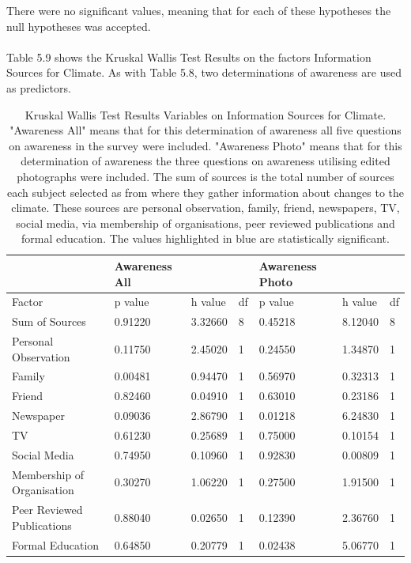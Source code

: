 There were no significant values, meaning that for each of these hypotheses the null hypotheses was accepted.
\paragraph{}
Table 5.9 shows the Kruskal Wallis Test Results on the factors Information Sources for Climate. As with Table 5.8, two determinations of awareness are used as predictors.



\begin{table}[H]
    \centering
    \begin{tabular}{|l|l|l|l|l|l|l|}
    \hline
        & \textbf{Awareness All} & ~ & ~ & \textbf{Awareness Photo} & ~ & ~ \\ \hline
        Factor & p value & h value & df & p value & h value & df \\ \hline
        Sum of Sources & 0.91220 & 3.32660 & 8 & 0.45218 & 8.12040 & 8 \\ \hline
        Personal Observation & 0.11750 & 2.45020 & 1 & 0.24550 & 1.34870 & 1 \\ \hline
        Family & \cellcolor[HTML]{7df9ff} 0.00481 & 0.94470 & 1 & 0.56970 & 0.32313 & 1 \\ \hline
        Friend & 0.82460 & 0.04910 & 1 & 0.63010 & 0.23186 & 1 \\ \hline
        Newspaper & 0.09036 & 2.86790 & 1 & \cellcolor[HTML]{7df9ff} 0.01218 & 6.24830 & 1 \\ \hline
        TV & 0.61230 & 0.25689 & 1 & 0.75000 & 0.10154 & 1 \\ \hline
        Social Media & 0.74950 & 0.10960 & 1 & 0.92830 & 0.00809 & 1 \\ \hline
        Membership of Organisation & 0.30270 & 1.06220 & 1 & 0.27500 & 1.91500 & 1 \\ \hline
        Peer Reviewed Publications  & 0.88040 & 0.02650 & 1 & 0.12390 & 2.36760 & 1 \\ \hline
        Formal Education & 0.64850 & 0.20779 & 1 & \cellcolor[HTML]{7df9ff} 0.02438 & 5.06770 & 1 \\ \hline
    \end{tabular}
    \caption{Kruskal Wallis Test Results Variables on Information Sources for Climate. "Awareness All" means that for this determination of awareness all five questions on awareness in the survey were included. "Awareness Photo" means that for this determination of awareness the three questions on awareness utilising edited photographs were included. The sum of sources is the total number of sources each subject selected as from where they gather information about changes to the climate. These sources are personal observation, family, friend, newspapers, TV, social media, via membership of organisations, peer reviewed publications and formal education. The values highlighted in blue are statistically significant. }
    \label{Kruskal_wallis_test_information}
\end{table}

